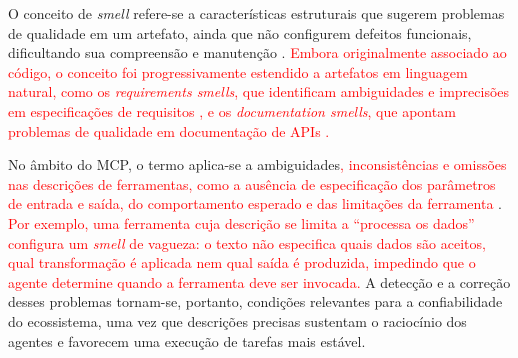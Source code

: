 O conceito de \textit{smell} refere-se a características estruturais que sugerem problemas de qualidade em um artefato, ainda que não configurem defeitos funcionais, dificultando sua compreensão e manutenção \cite{2026arXiv260214878M}. \textcolor{red}{Embora originalmente associado
ao código, o conceito foi progressivamente estendido a artefatos em linguagem natural, como os \textit{requirements smells}, que identificam ambiguidades e imprecisões em especificações de requisitos \cite{femmer2017}, e os \textit{documentation smells}, que apontam problemas de qualidade em documentação de APIs \cite{khan2021}.}

No âmbito do MCP, o termo aplica-se a ambiguidades\textcolor{red}{, inconsistências e omissões nas descrições de ferramentas, como a ausência de especificação dos parâmetros de entrada e saída, do comportamento esperado e das limitações da ferramenta }\cite{2026arXiv260214878M}. \textcolor{red}{Por exemplo, uma ferramenta cuja descrição se limita a ``processa os dados'' configura um \textit{smell} de vagueza: o texto não especifica quais dados são aceitos, qual transformação é aplicada nem qual saída é produzida, impedindo que o agente determine quando a ferramenta deve ser invocada.} A detecção e a correção desses problemas tornam-se, portanto, condições relevantes para a confiabilidade do ecossistema, uma vez que descrições precisas sustentam o raciocínio dos agentes e favorecem uma execução de tarefas mais estável.